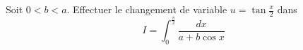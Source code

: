Soit $0<b<a$. Effectuer le changement de variable $u=\tan\frac{x}{2}$ dans
\begin{displaymath}
 I=\int_0^{\frac{\pi}{2}}\frac{dx}{a+b\cos x}
\end{displaymath}
\bigskip \bigskip